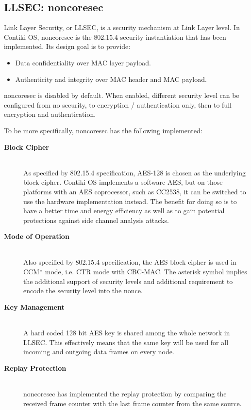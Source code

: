 \subsection{LLSEC: noncoresec}
Link Layer Security, or LLSEC, is a security mechanism at Link Layer level. In Contiki OS, noncoresec is the 802.15.4 security instantiation that has been implemented. Its design goal is to provide:
\begin{itemize}
\item Data confidentiality over MAC layer payload.
\item Authenticity and integrity over MAC header and MAC payload.
\end{itemize}

noncoresec is disabled by default. When enabled, different security level can be configured from no security, to encryption / authentication only, then to full encryption and authentication.

To be more specifically, noncoresec has the following implemented:

\begin{description}
\item[\textbf{Block Cipher}] \hfill \\
As specified by 802.15.4 specification, AES-128 is chosen as the underlying block cipher. Contiki OS implements a software AES, but on those platforms with an AES coprocessor, such as CC2538, it can be switched to use the hardware implementation instead. The benefit for doing so is to have a better time and energy efficiency as well as to gain potential protections against side channel analysis attacks.

\item[\textbf{Mode of Operation}] \hfill \\
Also specified by 802.15.4 specification, the AES block cipher is used in CCM* mode, i.e. CTR mode with CBC-MAC. The asterisk symbol implies the additional support of security levels and additional requirement to encode the security level into the nonce.

\item[\textbf{Key Management}] \hfill \\
 A hard coded 128 bit AES key is shared among the whole network in LLSEC. This effectively means that the same key will be used for all incoming and outgoing data frames on every node.
 
\item[\textbf{Replay Protection}] \hfill \\
noncoresec has implemented the replay protection by comparing the received frame counter with the last frame counter from the same source.
\end{description}

